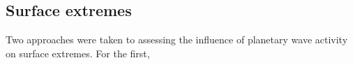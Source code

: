 \subsection{Surface extremes}

Two approaches were taken to assessing the influence of planetary wave activity on surface extremes. For the first, 